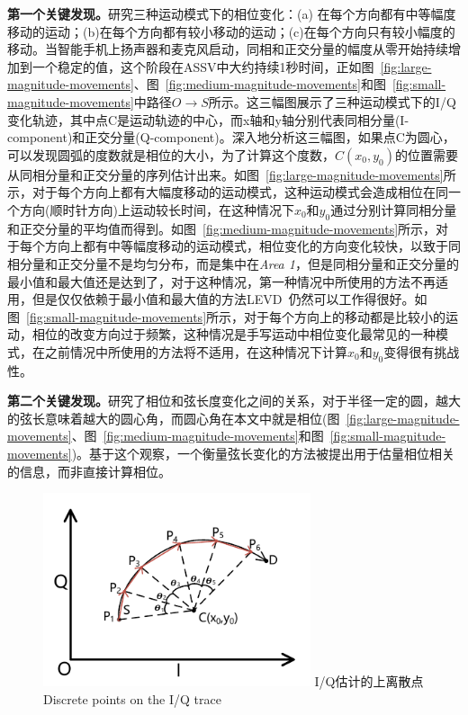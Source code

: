 \textbf{第一个关键发现。}研究三种运动模式下的相位变化：(a) 在每个方向都有中等幅度移动的运动；(b)在每个方向都有较小移动的运动；(c)在每个方向只有较小幅度的移动。当智能手机上扬声器和麦克风启动，同相和正交分量的幅度从零开始持续增加到一个稳定的值，这个阶段在ASSV中大约持续1秒时间，正如图~\ref{fig:large-magnitude-movements}、图~\ref{fig:medium-magnitude-movements}和图~\ref{fig:small-magnitude-movements}中路径$O\rightarrow S$所示。这三幅图展示了三种运动模式下的I/Q变化轨迹，其中点C是运动轨迹的中心，而x轴和y轴分别代表同相分量(I-component)和正交分量(Q-component)。深入地分析这三幅图，如果点C为圆心，可以发现圆弧的度数就是相位的大小，为了计算这个度数，$C(x_{0},y_{0})$的位置需要从同相分量和正交分量的序列估计出来。如图~\ref{fig:large-magnitude-movements}所示，对于每个方向上都有大幅度移动的运动模式，这种运动模式会造成相位在同一个方向(顺时针方向)上运动较长时间，在这种情况下$x_0$和$y_0$通过分别计算同相分量和正交分量的平均值而得到。如图~\ref{fig:medium-magnitude-movements}所示，对于每个方向上都有中等幅度移动的运动模式，相位变化的方向变化较快，以致于同相分量和正交分量不是均匀分布，而是集中在\textit{Area 1}，但是同相分量和正交分量的最小值和最大值还是达到了，对于这种情况，第一种情况中所使用的方法不再适用，但是仅仅依赖于最小值和最大值的方法LEVD~\cite{wang2016device}仍然可以工作得很好。如图~\ref{fig:small-magnitude-movements}所示，对于每个方向上的移动都是比较小的运动，相位的改变方向过于频繁，这种情况是手写运动中相位变化最常见的一种模式，在之前情况中所使用的方法将不适用，在这种情况下计算$x_{0}$和$y_{0}$变得很有挑战性。

\textbf{第二个关键发现。}研究了相位和弦长度变化之间的关系，对于半径一定的圆，越大的弦长意味着越大的圆心角，而圆心角在本文中就是相位(图~\ref{fig:large-magnitude-movements}、图~\ref{fig:medium-magnitude-movements}和图~\ref{fig:small-magnitude-movements})。基于这个观察，一个衡量弦长变化的方法被提出用于估量相位相关的信息，而非直接计算相位。

\begin{figure}[!htp]
  \centering
  \includegraphics[width=0.7\textwidth]{figure/estimation-geometry.pdf}
  \bicaption
    {I/Q估计的上离散点}
    {Discrete points on the I/Q trace}
  \label{fig:discrete-point-trace}
\end{figure}

